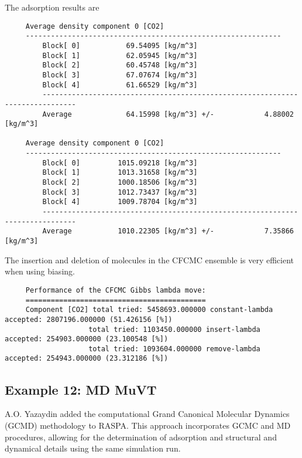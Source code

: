 \noindent
The adsorption results are
\begin{tiny}
\begin{verbatim}
     Average density component 0 [CO2]
     -------------------------------------------------------------
         Block[ 0]           69.54095 [kg/m^3]
         Block[ 1]           62.05945 [kg/m^3]
         Block[ 2]           60.45748 [kg/m^3]
         Block[ 3]           67.07674 [kg/m^3]
         Block[ 4]           61.66529 [kg/m^3]
         ------------------------------------------------------------------------------
         Average             64.15998 [kg/m^3] +/-            4.88002 [kg/m^3]

     Average density component 0 [CO2]
     -------------------------------------------------------------
         Block[ 0]         1015.09218 [kg/m^3]
         Block[ 1]         1013.31658 [kg/m^3]
         Block[ 2]         1000.18506 [kg/m^3]
         Block[ 3]         1012.73437 [kg/m^3]
         Block[ 4]         1009.78704 [kg/m^3]
         ------------------------------------------------------------------------------
         Average           1010.22305 [kg/m^3] +/-            7.35866 [kg/m^3]
\end{verbatim}
\end{tiny}

\indent
The insertion and deletion of molecules in the CFCMC ensemble is very efficient when using biasing.
\begin{tiny}
\begin{verbatim}
     Performance of the CFCMC Gibbs lambda move:
     ===========================================
     Component [CO2] total tried: 5458693.000000 constant-lambda accepted: 2807196.000000 (51.426156 [%])
                    total tried: 1103450.000000 insert-lambda accepted: 254903.000000 (23.100548 [%])
                    total tried: 1093604.000000 remove-lambda accepted: 254943.000000 (23.312186 [%])
\end{verbatim}
\end{tiny}

\subsection*{Example 12: MD MuVT}

A.O. Yazaydin added the computational Grand Canonical Molecular Dynamics (GCMD) methodology to RASPA\cite{Loganathan2017,Loganathan2018}.
This approach incorporates GCMC and MD procedures, allowing for the determination of adsorption and structural and
dynamical details using the same simulation run.

